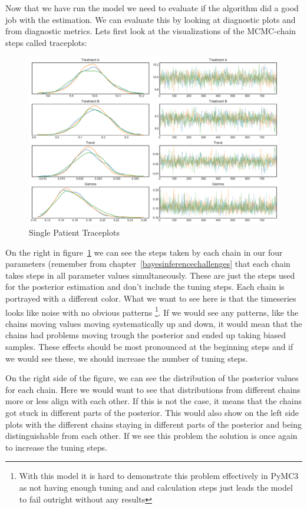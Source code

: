 \documentclass[12pt,a4paper,leqno]{report}
\theoremstyle{plain}
\theoremstyle{definition}
\theoremstyle{remark}
\begin{document}
Now that we have run the model we need to evaluate if the algorithm did a good job with
the estimation. We can evaluate this by looking at diagnostic plots and from diagnostic
metrics. Lets first look at the visualizations of the MCMC-chain steps called traceplots:

\begin{figure}[H]
    \caption{Single Patient Traceplots}
    \label{traceplots}
    \includegraphics[width=\textwidth,height=\textheight,keepaspectratio]{single_patient_traceplot.pdf}
\end{figure}

On the right in figure\ \ref{traceplots} we can see the steps taken by each
chain in our four parameters (remember from chapter\ \ref{bayesinferencechallenges} that
each chain takes steps in all parameter values simultaneously. These are
just the steps used for the posterior estimation and don't include the tuning steps. Each
chain is portrayed with a different color. What we want to see here is that the timeseries
looks like noise with no obvious patterns \footnote{With this model it is hard to
demonstrate this problem effectively in PyMC3 as not having enough tuning and and
calculation steps just leads the model to fail outright without any results}. If we would see any patterns, like the chains
moving values moving systematically up and down, it would mean that the
chains had problems moving trough the posterior and ended up taking biased samples.
These effects should be most pronounced at the beginning steps and if we would see
these, we should increase the number of tuning steps.

On the right side of the figure, we can see the distribution of the posterior values for each chain. Here we
would want to see that distributions from different chains more or less align with
each other. If this is not the case, it means that the chains got stuck in different
parts of the posterior. This would also show on the left side plots with the different
chains staying in different parts of the posterior and being distinguishable from each
other. If we see this problem the solution is once again to increase the tuning steps.
\end{document}
